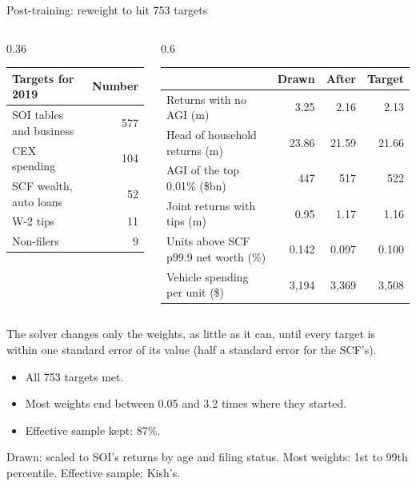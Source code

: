 \documentclass[11pt,aspectratio=169]{beamer}
\newcommand{\slidenote}[1]{\par\vfill{\scriptsize\color{yalegrey}#1}}
\begin{document}
\begin{frame}{Post-training: reweight to hit 753 targets}
  \footnotesize
  \renewcommand{\arraystretch}{1.12}
  \begin{columns}[T]
    \begin{column}{0.36\textwidth}
      \begin{tabular}{@{}lr@{}}
        \toprule
        Targets for 2019 & Number \\
        \midrule
        SOI tables and business & 577 \\
        CEX spending & 104 \\
        SCF wealth, auto loans & 52 \\
        W-2 tips & 11 \\
        Non-filers & 9 \\
        \bottomrule
      \end{tabular}
    \end{column}
    \begin{column}{0.6\textwidth}
      \begin{tabular}{@{}lrrr@{}}
        \toprule
        & Drawn & After & Target \\
        \midrule
        Returns with no AGI (m) & 3.25 & 2.16 & 2.13 \\
        Head of household returns (m) & 23.86 & 21.59 & 21.66 \\
        AGI of the top 0.01\% (\$bn) & 447 & 517 & 522 \\
        Joint returns with tips (m) & 0.95 & 1.17 & 1.16 \\
        Units above SCF p99.9 net worth (\%) & 0.142 & 0.097 & 0.100 \\
        Vehicle spending per unit (\$) & 3,194 & 3,369 & 3,508 \\
        \bottomrule
      \end{tabular}
    \end{column}
  \end{columns}

  \vspace{0.6em}
  \small
  The solver changes only the weights, as little as it can, until every target is within
  one standard error of its value (half a standard error for the SCF's).
  \begin{itemize}
    \item All 753 targets met.
    \item Most weights end between 0.05 and 3.2 times where they started.
    \item Effective sample kept: 87\%.
  \end{itemize}
  \slidenote{Drawn: scaled to SOI's returns by age and filing status. Most weights: 1st to 99th percentile. Effective sample: Kish's.}
\end{frame}
\end{document}
